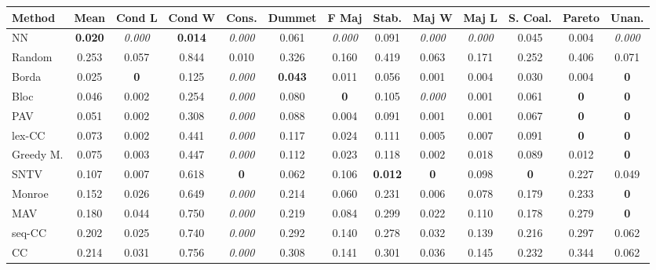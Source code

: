 \begin{tabular}{lcccccccccccc}
\toprule
Method & Mean & Cond L & Cond W & Cons. & Dummet & F Maj & Stab. & Maj W & Maj L & S. Coal. & Pareto & Unan. \\
\midrule
NN & \textbf{0.020} & \textit{0.000} & \textbf{0.014} & \textit{0.000} & 0.061 & \textit{0.000} & 0.091 & \textit{0.000} & \textit{0.000} & 0.045 & 0.004 & \textit{0.000} \\
Random & 0.253 & 0.057 & 0.844 & 0.010 & 0.326 & 0.160 & 0.419 & 0.063 & 0.171 & 0.252 & 0.406 & 0.071 \\
Borda & 0.025 & \textbf{0} & 0.125 & \textit{0.000} & \textbf{0.043} & 0.011 & 0.056 & 0.001 & 0.004 & 0.030 & 0.004 & \cellcolor{green!25}\textbf{0} \\
Bloc & 0.046 & 0.002 & 0.254 & \textit{0.000} & 0.080 & \cellcolor{green!25}\textbf{0} & 0.105 & \textit{0.000} & 0.001 & 0.061 & \cellcolor{green!25}\textbf{0} & \cellcolor{green!25}\textbf{0} \\
PAV & 0.051 & 0.002 & 0.308 & \textit{0.000} & 0.088 & 0.004 & 0.091 & 0.001 & 0.001 & 0.067 & \cellcolor{green!25}\textbf{0} & \textbf{0} \\
lex-CC & 0.073 & 0.002 & 0.441 & \textit{0.000} & 0.117 & 0.024 & 0.111 & 0.005 & 0.007 & 0.091 & \textbf{0} & \textbf{0} \\
Greedy M. & 0.075 & 0.003 & 0.447 & \cellcolor{green!25}\textit{0.000} & 0.112 & 0.023 & 0.118 & 0.002 & 0.018 & \cellcolor{green!25}0.089 & 0.012 & \cellcolor{green!25}\textbf{0} \\
SNTV & 0.107 & 0.007 & 0.618 & \cellcolor{green!25}\textbf{0} & 0.062 & 0.106 & \textbf{0.012} & \cellcolor{green!25}\textbf{0} & 0.098 & \cellcolor{green!25}\textbf{0} & 0.227 & 0.049 \\
Monroe & 0.152 & 0.026 & 0.649 & \cellcolor{green!25}\textit{0.000} & 0.214 & 0.060 & 0.231 & 0.006 & 0.078 & 0.179 & 0.233 & \cellcolor{green!25}\textbf{0} \\
MAV & 0.180 & 0.044 & 0.750 & \textit{0.000} & 0.219 & 0.084 & 0.299 & 0.022 & 0.110 & 0.178 & 0.279 & \textbf{0} \\
seq-CC & 0.202 & 0.025 & 0.740 & \textit{0.000} & 0.292 & 0.140 & 0.278 & 0.032 & 0.139 & 0.216 & 0.297 & 0.062 \\
CC & 0.214 & 0.031 & 0.756 & \cellcolor{green!25}\textit{0.000} & 0.308 & 0.141 & 0.301 & 0.036 & 0.145 & 0.232 & 0.344 & 0.062 \\
\bottomrule
\end{tabular}
